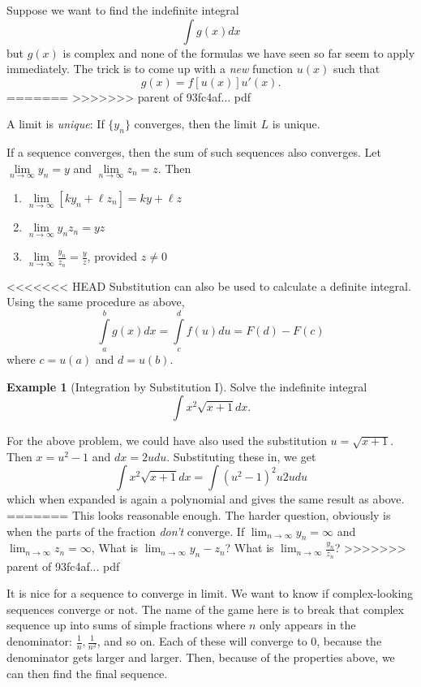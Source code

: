 \documentclass[]{book}
\providecommand{\tightlist}{%
  \setlength{\itemsep}{0pt}\setlength{\parskip}{0pt}}
\theoremstyle{definition}
\theoremstyle{definition}
\newtheorem{example}{Example}[chapter]
\theoremstyle{definition}
\theoremstyle{remark}
\begin{document}
Suppose we want to find the indefinite integral \[\int g(x)dx\] but \(g(x)\) is complex and none of the formulas we have seen so far seem to apply immediately. The trick is to come up with a \emph{new} function \(u(x)\) such that \[g(x)=f[u(x)]u'(x).\]
=======
>>>>>>> parent of 93fc4af... pdf

A limit is \emph{unique}: If \(\{y_n\}\) converges, then the limit \(L\) is unique.

If a sequence converges, then the sum of such sequences also converges. Let \(\lim\limits_{n \to \infty} y_n = y\) and \(\lim\limits_{n \to \infty} z_n =z\). Then

\begin{enumerate}
\def\labelenumi{\arabic{enumi}.}
\tightlist
\item
  \(\lim\limits_{n \to \infty} [k y_n + \ell z_n]= k y + \ell z\)
\item
  \(\lim\limits_{n \to \infty} y_n z_n = yz\)
\item
  \(\lim\limits_{n \to \infty} \frac{y_n}{z_n} = \frac{y}{z}\), provided \(z\neq 0\)
\end{enumerate}

<<<<<<< HEAD
Substitution can also be used to calculate a definite integral. Using the same procedure as above, \[\int\limits_a^b g(x)dx=\int\limits_c^d f(u)du = F(d)-F(c)\]
where \(c=u(a)\) and \(d=u(b)\).

\begin{example}[Integration by Substitution I]
\protect\hypertarget{exm:intsub1}{}{\label{exm:intsub1} {} }
Solve the indefinite integral \[\int x^2 \sqrt{x+1}dx.\]
\end{example}

For the above problem, we could have also used the substitution \(u=\sqrt{x+1}\). Then \(x=u^2-1\) and \(dx=2u du\). Substituting these in, we get \[\int x^2\sqrt{x+1}dx=\int (u^2-1)^2 u 2u du\] which when expanded is again a polynomial and gives the same result as above.
=======
This looks reasonable enough. The harder question, obviously is when the parts of the fraction \emph{don't} converge. If \(\lim_{n\to\infty} y_n = \infty\) and \(\lim_{n\to\infty} z_n = \infty\), What is \(\lim_{n\to\infty} y_n - z_n\)? What is \(\lim_{n\to\infty} \frac{y_n}{z_n}\)?
>>>>>>> parent of 93fc4af... pdf

It is nice for a sequence to converge in limit. We want to know if complex-looking sequences converge or not. The name of the game here is to break that complex sequence up into sums of simple fractions where \(n\) only appears in the denominator: \(\frac{1}{n}, \frac{1}{n^2}\), and so on. Each of these will converge to 0, because the denominator gets larger and larger. Then, because of the properties above, we can then find the final sequence.
\end{document}
